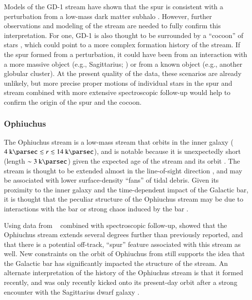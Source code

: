 \documentclass[final,5p,times,twocolumn,authoryear]{elsarticle}
\begin{document}
Models of the GD-1 stream have shown that the spur is consistent with a perturbation
from a low-mass dark matter subhalo \citep{bonaca:2019, bonaca:2020b}.
However, further observations and modeling of the stream are needed to fully confirm
this interpretation.
For one, GD-1 is also thought to be surrounded by a ``cocoon'' of stars
\citep{malhan:2019a}, which could point to a more complex formation history of the
stream.
If the spur formed from a perturbation, it could have been from an interaction with a
more massive object (e.g., Sagittarius; \citealt{dillamore:2022}) or from a known object
(e.g., another globular cluster).
At the present quality of the data, these scenarios are already unlikely, but more
precise proper motions of individual stars in the spur and stream combined with more
extensive spectroscopic follow-up would help to confirm the origin of the spur and the
cocoon.


\subsubsection{Ophiuchus}
\label{sec:ophiuchus}

The Ophiuchus stream is a low-mass stream that orbits in the inner galaxy ($4~\kpc
\lesssim r \lesssim 14~\kpc$), and is notable because it is unexpectedly short (length
$\sim 3~\kpc$) given the expected age of the stream and its orbit \citep{bernard:2014,
sesar:2015}.
The stream is thought to be extended almost in the line-of-sight direction
\citep{sesar:2016}, and may be associated with lower surface-density ``fans'' of tidal
debris.
Given its proximity to the inner galaxy and the time-dependent impact of the Galactic
bar, it is thought that the peculiar structure of the Ophiuchus stream may be due to
interactions with the bar or strong chaos induced by the bar \citep{sesar:2016,
price-whelan:2016b}.

Using data from \gaia\  combined with spectroscopic follow-up,
\citet{caldwell:2020} showed that the Ophiuchus stream extends several degrees further
than previously reported, and that there is a potential off-track, ``spur'' feature
associated with this stream as well.
New constraints on the orbit of Ophiuchus from \citet{caldwell:2020} still supports the
idea that the Galactic bar has significantly impacted the structure of the stream.
An alternate interpretation of the history of the Ophiuchus stream is that it formed
recently, and was only recently kicked onto its present-day orbit after a strong
encounter with the Sagittarius dwarf galaxy \citep{lane:2020}.
\end{document}
